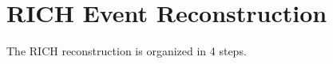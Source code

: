 \documentclass[5p,times,twocolumn]{elsarticle}
\def\MaPMT{MaPMT }
\def\MAROC{MAROC3 }
\begin{document}
\section{RICH Event Reconstruction}
\label{sec:RICHReco}

The RICH reconstruction is organized in 4 steps.

\end{document}
